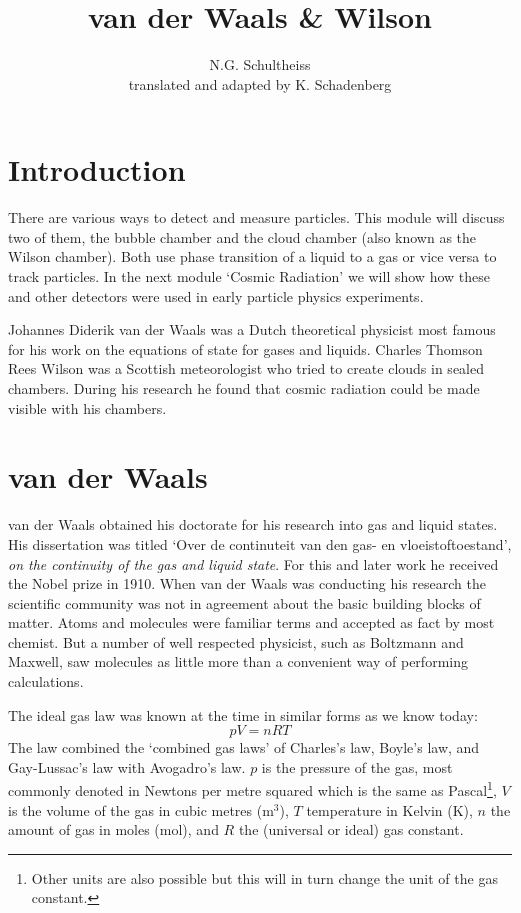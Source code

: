 



\author{N.G. Schultheiss \\ translated and adapted by K. Schadenberg}
\date{}
\title{van der Waals \& Wilson}



\maketitle

\section{Introduction}
There are various ways to detect and measure particles. This module will discuss two of them, the bubble chamber and the cloud chamber (also known as the Wilson chamber). Both use phase transition of a liquid to a gas or vice versa to track particles. In the next module `Cosmic Radiation' we will show how these and other detectors were used in early particle physics experiments.

Johannes Diderik van der Waals was a Dutch theoretical physicist most famous for his work on the equations of state for gases and liquids. Charles Thomson Rees Wilson was a Scottish meteorologist who tried to create clouds in sealed chambers. During his research he found that cosmic radiation could be made visible with his chambers.

\section{van der Waals}
van der Waals obtained his doctorate for his research into gas and liquid states. His dissertation was titled `Over de continuteit van den gas- en vloeistoftoestand', \textit{on the continuity of the gas and liquid state}. For this and later work he received the Nobel prize in 1910. When van der Waals was conducting his research the scientific community was not in agreement about the basic building blocks of matter. Atoms and molecules were familiar terms and accepted as fact by most chemist. But a number of well respected physicist, such as Boltzmann and Maxwell, saw molecules as little more than a convenient way of performing calculations.

The ideal gas law was known at the time in similar forms as we know today:
\begin{equation}
pV=nRT \label{eq:ideal_gas_law}
\end{equation}
The law combined the `combined gas laws' of Charles's law, Boyle's law, and Gay-Lussac's law with Avogadro's law. $p$ is the pressure of the gas, most commonly denoted in Newtons per metre squared which is the same as Pascal\footnote{Other units are also possible but this will in turn change the unit of the gas constant.}, $V$ is the volume of the gas in cubic metres (m$^3$), $T$ temperature in Kelvin (K), $n$ the amount of gas in moles (mol), and $R$ the (universal or ideal) gas constant.


